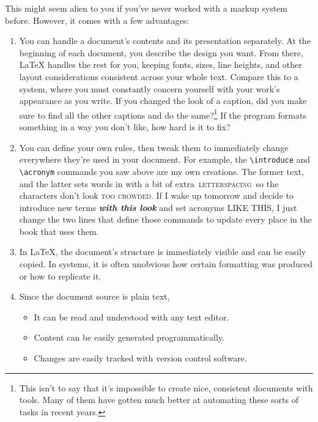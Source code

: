 This might seem alien to you if you've never worked with a markup system before.
However, it comes with a few advantages:
\begin{enumerate}
\item You can handle a document's contents and its presentation separately.
    At the beginning of each document,
    you describe the design you want.
    From there, \LaTeX{} handles the rest for you,
    keeping fonts, sizes, line heights,
    and other layout considerations consistent across your whole text.
    Compare this to a  system,
    where you must constantly concern yourself with your work's appearance
    as you write.
    If you changed the look of a caption,
    did you make sure to find all the other captions and do the
    same?\footnote{This isn't to say that it's impossible
    to create nice, consistent documents with  tools.
    Many of them have gotten much better at automating these sorts of
    tasks in recent years.}
    If the program formats something in a way you don't like,
    how hard is it to fix?%

\item You can define your own rules, then tweak them to immediately change
    everywhere they're used in your document.
    For example, the \verb|\introduce| and \verb|\acronym| commands you saw above
    are my own creations. The former  text, and
    the latter sets words in  with a bit of extra
    \,\textsc{letterspacing}\, so the characters
    don't look \textsc{too crowded}.
    If I wake up tomorrow and decide to introduce new terms
    \textbf{\itshape with this look} and set acronyms
    {\small{} LIKE THIS},
    I just change the two lines that define those commands
    to update every place in the book that uses them.
\item In \LaTeX, the document's structure is immediately visible
    and can be easily copied.
    In  systems, it is often unobvious
    how certain formatting was produced
    or how to replicate it.
\item Since the document source is plain text,
    \begin{itemize}
    \item It can be read and understood with any text editor.
    \item Content can be easily generated programmatically.
    \item Changes are easily tracked with version control software.
    \end{itemize}
\end{enumerate}

